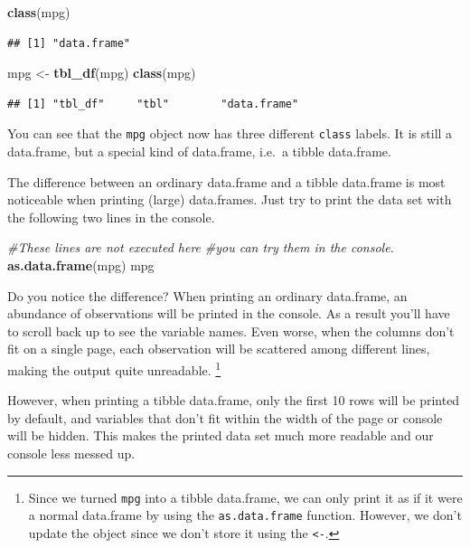 \documentclass[]{tufte-book}
\newenvironment{Shaded}{}{}
\newcommand{\CommentTok}[1]{\textcolor[rgb]{0.38,0.63,0.69}{\textit{#1}}}
\newcommand{\KeywordTok}[1]{\textcolor[rgb]{0.00,0.44,0.13}{\textbf{#1}}}
\newcommand{\NormalTok}[1]{#1}
\newcommand{\StringTok}[1]{\textcolor[rgb]{0.25,0.44,0.63}{#1}}
\begin{document}
\begin{Shaded}
\begin{Highlighting}[]
\KeywordTok{class}\NormalTok{(mpg)}
\end{Highlighting}
\end{Shaded}

\begin{verbatim}
## [1] "data.frame"
\end{verbatim}

\begin{Shaded}
\begin{Highlighting}[]
\NormalTok{mpg <-}\StringTok{ }\KeywordTok{tbl_df}\NormalTok{(mpg)}
\KeywordTok{class}\NormalTok{(mpg)}
\end{Highlighting}
\end{Shaded}

\begin{verbatim}
## [1] "tbl_df"     "tbl"        "data.frame"
\end{verbatim}

You can see that the \texttt{mpg} object now has three different \texttt{class} labels. It is still a data.frame, but a special kind of data.frame, i.e.~a tibble data.frame.

The difference between an ordinary data.frame and a tibble data.frame is most noticeable when printing (large) data.frames. Just try to print the data set with the following two lines in the console.

\begin{Shaded}
\begin{Highlighting}[]
\CommentTok{#These lines are not executed here }
\CommentTok{#you can try them in the console.}
\KeywordTok{as.data.frame}\NormalTok{(mpg)}
\NormalTok{mpg}
\end{Highlighting}
\end{Shaded}

Do you notice the difference? When printing an ordinary data.frame, an abundance of observations will be printed in the console. As a result you'll have to scroll back up to see the variable names. Even worse, when the columns don't fit on a single page, each observation will be scattered among different lines, making the output quite unreadable. \footnote{Since we turned \texttt{mpg} into a tibble data.frame, we can only print it as if it were a normal data.frame by using the \texttt{as.data.frame} function. However, we don't update the object since we don't store it using the \texttt{\textless{}-}.}

However, when printing a tibble data.frame, only the first 10 rows will be printed by default, and variables that don't fit within the width of the page or console will be hidden. This makes the printed data set much more readable and our console less messed up.
\end{document}
